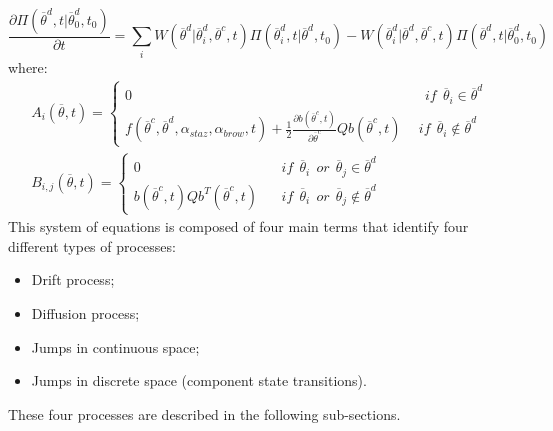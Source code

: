 \begin{equation}
\frac{\partial \Pi \left (\overline{\theta}^{d},t|\overline{\theta}_{0}^{d},t_{0}  
\right ) }{\partial t} =
\sum_{i} W\left ( \overline{\theta}^{d}|
\overline{\theta}^{d}_{i},\overline{\theta}^{c},t \right ) \Pi \left (\overline{\theta}^{d}_{i},t|\overline{\theta}^{d},t_{0}  
\right ) - W\left ( \overline{\theta}^{d}_{i}|
\overline{\theta}^{d},\overline{\theta}^{c},t \right ) \Pi \left (\overline{\theta}^{d},t|\overline{\theta}^{d}_{0},t_{0}  
\right ) 
\end{equation}
where:
\begin{equation}
\begin{matrix}
A_{i}\left ( \overline{\theta}, t \right ) = \left\{\begin{matrix}
0 & \: \: if  \: \: \overline{\theta}_{i} \in \overline{\theta}^{d} 
\\ 
f\left ( \overline{\theta}^{c},\overline{\theta}^{d},\alpha_{staz},\alpha_{brow},t \right ) +\frac{1}{2}\frac{\partial b\left ( \overline{\theta}^{c},t \right )}{\partial \overline{\theta}^{c}}Qb\left ( \overline{\theta}^{c},t \right ) \: \: & if  \: \: \overline{\theta}_{i} \notin \overline{\theta}^{d} 
\end{matrix}\right.
\\ 
B_{i,j}\left ( \overline{\theta}, t \right ) = \left\{\begin{matrix}
0 & \: \: if  \: \: \overline{\theta}_{i} \: \: or \: \: \overline{\theta}_{j}  \in \overline{\theta}^{d} 
\\ 
b\left ( \overline{\theta}^{c},t \right )Qb^{T}\left (  \overline{\theta}^{c},t \right ) \: \: & \: \: if  \: \: \overline{\theta}_{i} \: \: or \: \: \overline{\theta}_{j}  \notin \overline{\theta}^{d} 
\end{matrix}\right.
\end{matrix}
\end{equation}
This system of equations is composed of four main terms that identify four different types of processes:
\begin{itemize}
  \item Drift process;
  \item Diffusion process;
  \item Jumps in continuous space;
  \item Jumps in discrete space (component state transitions).
\end{itemize}
 These four processes are described in the following sub-sections.
%
%
%
%
